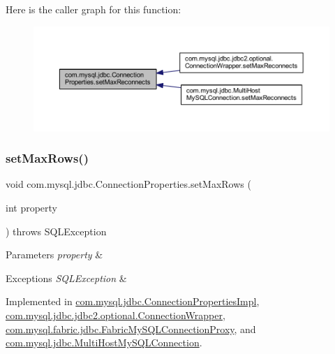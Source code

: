 Here is the caller graph for this function\+:\nopagebreak
\begin{figure}[H]
\begin{center}
\leavevmode
\includegraphics[width=350pt]{interfacecom_1_1mysql_1_1jdbc_1_1_connection_properties_aa4dbdf7b74fc014b67992de0cf9247c9_icgraph}
\end{center}
\end{figure}
\mbox{\label{interfacecom_1_1mysql_1_1jdbc_1_1_connection_properties_afbeac8befbc0374361e27aa4fead424a}} 
\subsubsection{\texorpdfstring{set\+Max\+Rows()}{setMaxRows()}}
{\footnotesize\ttfamily void com.\+mysql.\+jdbc.\+Connection\+Properties.\+set\+Max\+Rows (\begin{DoxyParamCaption}\item[{int}]{property }\end{DoxyParamCaption}) throws S\+Q\+L\+Exception}


\begin{DoxyParams}{Parameters}
{\em property} & \\
\hline
\end{DoxyParams}

\begin{DoxyExceptions}{Exceptions}
{\em S\+Q\+L\+Exception} & \\
\hline
\end{DoxyExceptions}


Implemented in \mbox{\hyperlink{classcom_1_1mysql_1_1jdbc_1_1_connection_properties_impl_ab68e0b343a7cbdbefb2b9163680e3060}{com.\+mysql.\+jdbc.\+Connection\+Properties\+Impl}}, \mbox{\hyperlink{classcom_1_1mysql_1_1jdbc_1_1jdbc2_1_1optional_1_1_connection_wrapper_a21b7e7ac26548d9266485dce22f5af21}{com.\+mysql.\+jdbc.\+jdbc2.\+optional.\+Connection\+Wrapper}}, \mbox{\hyperlink{classcom_1_1mysql_1_1fabric_1_1jdbc_1_1_fabric_my_s_q_l_connection_proxy_a87dee06c898fb9795dcfdfaf34889c51}{com.\+mysql.\+fabric.\+jdbc.\+Fabric\+My\+S\+Q\+L\+Connection\+Proxy}}, and \mbox{\hyperlink{classcom_1_1mysql_1_1jdbc_1_1_multi_host_my_s_q_l_connection_a15920ec9b291f698817ea82c8ecabfbe}{com.\+mysql.\+jdbc.\+Multi\+Host\+My\+S\+Q\+L\+Connection}}.

